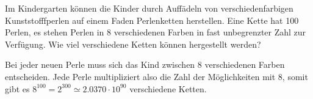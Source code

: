 Im Kindergarten können die Kinder durch Auffädeln von
verschiedenfarbigen Kunststofffperlen auf einem Faden
Perlenketten herstellen. Eine Kette hat 100 Perlen,
es stehen Perlen in 8 verschiedenen Farben in fast unbegrenzter
Zahl zur Verfügung.
Wie viel verschiedene Ketten können hergestellt werden?

\begin{loesung}
Bei jeder neuen Perle muss sich das Kind zwischen 8 verschiedenen
Farben entscheiden. Jede Perle multipliziert also die Zahl
der Möglichkeiten mit $8$, somit gibt es
$8^{100}=2^{300}\simeq2.0370\cdot10^{90}$
verschiedene Ketten.
\end{loesung}


